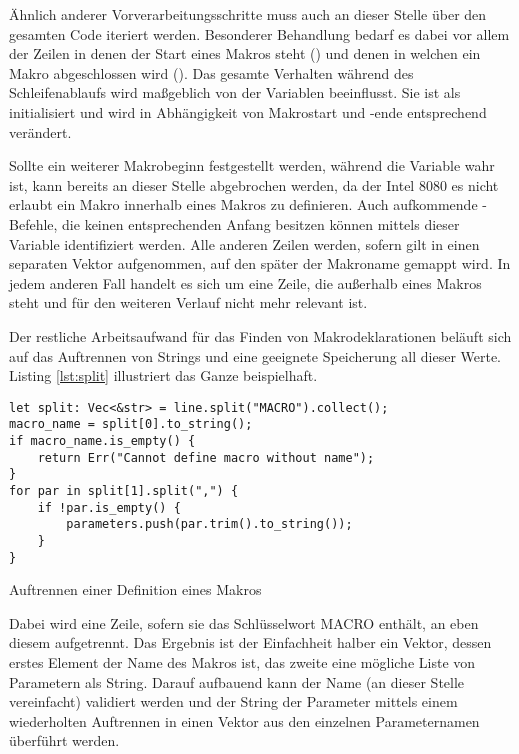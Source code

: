 Ähnlich anderer Vorverarbeitungsschritte muss auch an dieser Stelle über den gesamten Code iteriert werden. Besonderer Behandlung bedarf es dabei vor allem der Zeilen in denen der Start eines Makros steht () und denen in welchen ein Makro abgeschlossen wird (). Das gesamte Verhalten während des Schleifenablaufs wird maßgeblich von der Variablen  beeinflusst. Sie ist als  initialisiert und wird in Abhängigkeit von Makrostart und -ende entsprechend verändert. 

Sollte ein weiterer Makrobeginn festgestellt werden, während die Variable wahr ist, kann bereits an dieser Stelle abgebrochen werden, da der Intel 8080 es nicht erlaubt ein Makro innerhalb eines Makros zu definieren. Auch aufkommende -Befehle, die keinen entsprechenden Anfang besitzen können mittels dieser Variable identifiziert werden. Alle anderen Zeilen werden, sofern  gilt in einen separaten Vektor aufgenommen, auf den später der Makroname gemappt wird. In jedem anderen Fall handelt es sich um eine Zeile, die außerhalb eines Makros steht und für den weiteren Verlauf nicht mehr relevant ist.

Der restliche Arbeitsaufwand für das Finden von Makrodeklarationen beläuft sich auf das Auftrennen von Strings und eine geeignete Speicherung all dieser Werte. Listing \ref{lst:split} illustriert das Ganze beispielhaft.

\begin{listing}[th]
\begin{verbatim}
let split: Vec<&str> = line.split("MACRO").collect();
macro_name = split[0].to_string();
if macro_name.is_empty() {
    return Err("Cannot define macro without name");
}
for par in split[1].split(",") {
    if !par.is_empty() {
        parameters.push(par.trim().to_string());
    }
}
\end{verbatim}
\label{lst:split}
\caption{Auftrennen einer Definition eines Makros}
\end{listing}

Dabei wird eine Zeile, sofern sie das Schlüsselwort \glqq MACRO\grqq{} enthält, an eben diesem aufgetrennt. Das Ergebnis ist der Einfachheit halber ein Vektor, dessen erstes Element der Name des Makros ist, das zweite eine mögliche Liste von Parametern als String. Darauf aufbauend kann der Name (an dieser Stelle vereinfacht) validiert werden und der String der Parameter mittels einem wiederholten Auftrennen in einen Vektor aus den einzelnen Parameternamen überführt werden.

